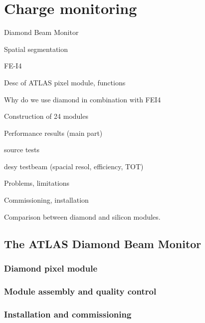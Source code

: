 \documentclass[12pt]{packages/mytustyle}  %
\begin{document}
\baselineskip=15pt



\chapter{Charge monitoring}

Diamond Beam Monitor

Spatial segmentation

FE-I4

Desc of ATLAS pixel module, functions

Why do we use diamond in combination with FEI4

Construction of 24 modules

Performance results (main part)

source tests

desy testbeam (spacial resol, efficiency, TOT)

Problems, limitations

Commissioning, installation

Comparison between diamond and silicon modules.




\clearpage
\section{The ATLAS Diamond Beam Monitor}
\label{sec:atlasdbm}

\subsection{Diamond pixel module}
\subsection{Module assembly and quality control}
\subsection{Installation and commissioning}
\end{document}
